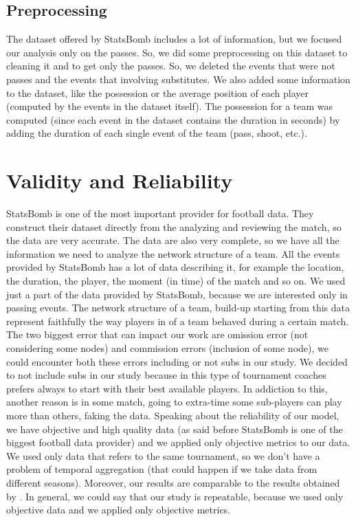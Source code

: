 \documentclass[12pt, a4paper]{article}
\begin{document}
\subsection{Preprocessing}
The dataset offered by StatsBomb includes a lot of information, but we focused our analysis only on the passes. So, we did some preprocessing on this dataset to cleaning it and to get only the passes. So, we deleted the events that were not passes and the events that involving substitutes. We also added some information to the dataset, like the possession or the average position of each player (computed by the events in the dataset itself). The possession for a team was computed (since each event in the dataset contains the duration in seconds) by adding the duration of each single event of the team (pass, shoot, etc.).
 

\section{Validity and Reliability}
\label{validity-and-reliability}
StatsBomb is one of the most important provider for football data. They construct their dataset directly from the analyzing and reviewing the match, so the data are very accurate. The data are also very complete, so we have all the information we need to analyze the network structure of a team. All the events provided by StatsBomb has a lot of data describing it, for example the location, the duration, the player, the moment (in time) of the match and so on. We used just a part of the data provided by StatsBomb, because we are interested only in passing events. The network structure of a team, build-up starting from this data represent faithfully the way players in of a team behaved during a certain match. The two biggest error that can impact our work are omission error (not considering some nodes) and commission errors (inclusion of some node), we could encounter both these errors including or not subs in our study. We decided to not include subs in our study because in this type of tournament coaches prefers always to start with their best available players. In addiction to this, another reason is in some match, going to extra-time some sub-players can play more than others, faking the data. Speaking about the reliability of our model, we have objective and high quality data (as said before StatsBomb is one of the biggest football data provider) and we applied only objective metrics to our data. We used only data that refers to the same tournament, so we don't have a problem of temporal aggregation (that could happen if we take data from different seasons). Moreover, our results are comparable to the results obtained by \cite{GRUND}. In general, we could say that our study is repeatable, because we used only objective data and we applied only objective metrics.
\end{document}
